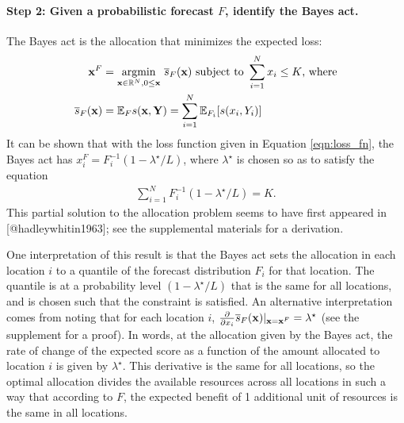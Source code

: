 \documentclass{article}
\begin{document}
\paragraph{Step 2: Given a probabilistic forecast $F$, identify the Bayes act.} The Bayes act is the allocation that minimizes the expected loss:
\begin{align}
    \mathbf{x}^F &= \underset{\mathbf{x}\in \mathbb{R}^N, 0 \leq \mathbf{x}}{\mathrm{arg min}}\,\, \overline{s}_F(\mathbf{x}) \text{ subject to } 
    \sum_{i=1}^N x_i \leq K \text{, where} \label{AP} \\
    \overline{s}_F(\mathbf{x}) &= \mathbb{E}_{F} s(\mathbf{x}, \mathbf{Y}) = \sum_{i=1}^{N} \mathbb{E}_{F_i}[s(x_i, Y_i)] \label{eqn:sbar}
\end{align}
It can be shown that with the loss function given in Equation \eqref{eqn:loss_fn}, the Bayes act has $x^F_i = F_i^{-1}(1 - \lambda^{\star}/L)$, where $\lambda^{\star}$ is chosen so as to satisfy the equation
\begin{align}
\sum_{i=1}^{N}F_i^{-1}(1 - \lambda^{\star}/L) = K.
\end{align}
This partial solution to the allocation problem seems to have first appeared in [@hadleywhitin1963]; see the supplemental materials for a derivation.

One interpretation of this result is that the Bayes act sets the allocation in each location $i$ to a quantile of the forecast distribution $F_i$ for that location. The quantile is at a probability level $(1 - \lambda^{\star}/L)$ that is the same for all locations, and is chosen such that the constraint is satisfied. An alternative interpretation comes from noting that for each location $i$, $\frac{\partial}{\partial x_i} \overline{s}_F(\mathbf{x}) \vert_{\mathbf{x}=\mathbf{x}^F} = \lambda^{\star}$ (see the supplement for a proof).
In words, at the allocation given by the Bayes act, the rate of change of the expected score as a function of the amount allocated to location $i$ is given by $\lambda^{\star}$.
This derivative is the same for all locations, so the optimal allocation divides the available resources across all locations in such a way that according to $F$, the expected benefit of 1 additional unit of resources is the same in all locations.
\end{document}
